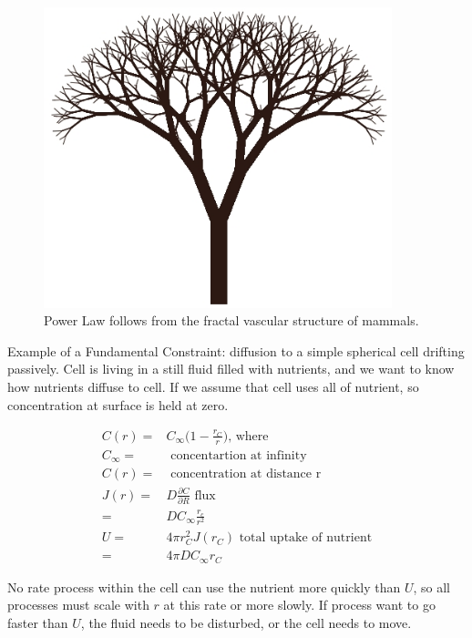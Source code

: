 \documentclass[]{article}
\begin{document}
\begin{figure}[H]
	\caption{Power Law follows from the fractal vascular structure of mammals.}\label{fig:FractalBranching}
	\includegraphics[width=0.9\textwidth]{FractalBranching}
\end{figure}

Example of a Fundamental Constraint: diffusion to a simple spherical cell drifting passively. Cell is living in a still fluid filled with nutrients, and we want to know how nutrients diffuse to cell. If we assume that cell uses all of nutrient, so concentration at surface is held at zero.

\begin{align*}
C(r) =& C_{\infty}\big(1 - \frac{r_C}{r}\big)\text{, where}\\
C_{\infty} =& \text{ concentartion at infinity}\\
C(r) =& \text{ concentration at distance r}\\
J(r) =& D\frac{\partial C}{\partial R} \text{ flux}\\
  =& D C_{\infty} \frac{r_c}{r^2}\\
U =& 4 \pi r_C^2 J(r_C) \text{ total uptake of nutrient}\\
=&4 \pi D C_{\infty} r_C 
\end{align*}

No rate process within the cell can use the nutrient more quickly than $U$, so all processes must scale with $r$ at this rate or more slowly. If process want to go faster than $U$, the fluid needs to be disturbed, or the cell needs to move.
\end{document}
